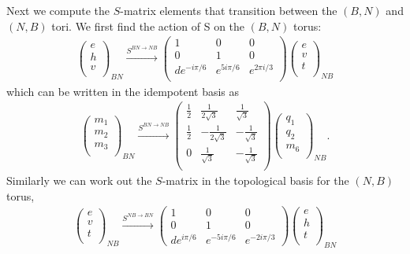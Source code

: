 Next we compute the $S$-matrix elements that transition between the $(B,N)$ and $(N,B)$ tori.
We first find the action of S on the $(B,N)$ torus:
\begin{align}
\left( \begin{matrix}
e\\
h\\
v\\
\end{matrix} \right)_{BN} 
 \xrightarrow{S^{BN\rightarrow NB}}
\left( \begin{matrix}
1&0&0\\
0&1&0\\
d e^{-i \pi/6} & e^{5 i \pi/6}  & e^{2 \pi i /3}\\
\end{matrix} \right)
\left( \begin{matrix}
e\\
v\\
t\\
\end{matrix} \right)_{NB}
\end{align}
which can be written in the idempotent basis as
\begin{align}\left( \begin{matrix}
{m}_1\\
{m}_2\\
{m}_3\\
\end{matrix} \right)_{BN}
\xrightarrow{S^{BN \rightarrow NB}}
\left( \begin{matrix}
\frac{1}{2} & \frac{1}{2 \sqrt{3}} &  \frac{1}{\sqrt{3}} \\
\frac{1}{2} & - \frac{1}{2\sqrt{3}} & -\frac{1}{\sqrt{3}} \\
0& \frac{1}{\sqrt{3}} & -\frac{1}{\sqrt{3}} \\
\end{matrix} \right)
\left( \begin{matrix}
{q}_1\\
{q}_2\\
{m}_6\\
\end{matrix} \right)_{NB}.
\end{align}
Similarly we can work out the $S$-matrix in the topological basis for the $(N,B)$ torus,
\begin{align}
\left( \begin{matrix}
e \\ 
v\\ 
t\\ 
\end{matrix} \right)_{NB}
  \xrightarrow{S^{NB \rightarrow BN}}
\left( \begin{matrix}
1&0&0\\
0&1&0\\
de^{i \pi/6} & e^{-5 i \pi /6} & e^{-2 i \pi /3}
\end{matrix} \right)
\left( \begin{matrix}
e \\
h\\ 
t\\ 
\end{matrix} \right)_{BN} 
\end{align}
